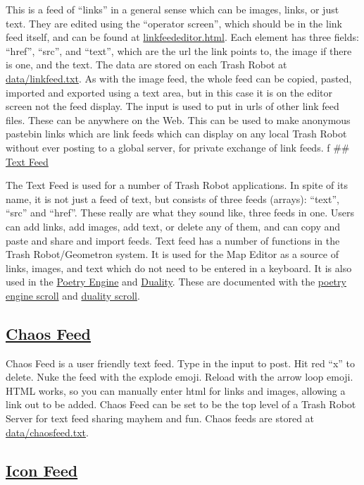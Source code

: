 This is a feed of ``links'' in a general sense which can be images,
links, or just text. They are edited using the ``operator screen'',
which should be in the link feed itself, and can be found at
\url{linkfeededitor.html}. Each element has three fields: ``href'',
``src'', and ``text'', which are the url the link points to, the image
if there is one, and the text. The data are stored on each Trash Robot
at \url{data/linkfeed.txt}. As with the image feed, the whole feed can
be copied, pasted, imported and exported using a text area, but in this
case it is on the editor screen not the feed display. The input is used
to put in urls of other link feed files. These can be anywhere on the
Web. This can be used to make anonymous pastebin links which are link
feeds which can display on any local Trash Robot without ever posting to
a global server, for private exchange of link feeds. f \#\#
\href{textfeed.html}{Text Feed}

The Text Feed is used for a number of Trash Robot applications. In spite
of its name, it is not just a feed of text, but consists of three feeds
(arrays): ``text'', ``src'' and ``href''. These really are what they
sound like, three feeds in one. Users can add links, add images, add
text, or delete any of them, and can copy and paste and share and import
feeds. Text feed has a number of functions in the Trash Robot/Geometron
system. It is used for the Map Editor as a source of links, images, and
text which do not need to be entered in a keyboard. It is also used in
the \href{poetryengine.html}{Poetry Engine} and
\href{duality.html}{Duality}. These are documented with the
\href{scrolls/poetryengine}{poetry engine scroll} and
\href{scrolls/duality}{duality scroll}.

\hypertarget{chaos-feed}{%
\subsection{\texorpdfstring{\href{chaosfeed.html}{Chaos
Feed}}{Chaos Feed}}\label{chaos-feed}}

Chaos Feed is a user friendly text feed. Type in the input to post. Hit
red ``x'' to delete. Nuke the feed with the explode emoji. Reload with
the arrow loop emoji. HTML works, so you can manually enter html for
links and images, allowing a link out to be added. Chaos Feed can be set
to be the top level of a Trash Robot Server for text feed sharing mayhem
and fun. Chaos feeds are stored at \url{data/chaosfeed.txt}.

\hypertarget{icon-feed}{%
\subsection{\texorpdfstring{\href{iconfeed.html}{Icon
Feed}}{Icon Feed}}\label{icon-feed}}

